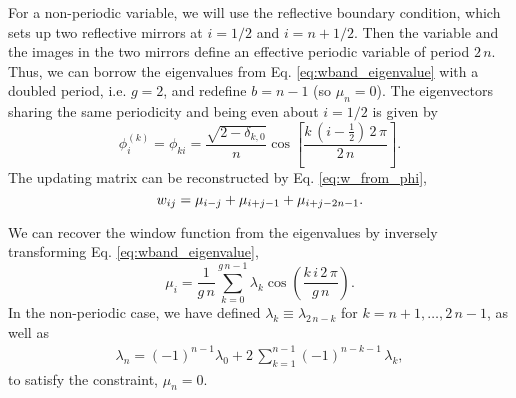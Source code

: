 \documentclass[reprint, superscriptaddress, floatfix]{revtex4-1}
\begin{document}
For a non-periodic variable,
we will use the reflective boundary condition\cite{bussi2006},
which sets up two reflective mirrors at
$i = 1/2$ and $i = n + 1/2$.
%
Then the variable and the images in the two mirrors
define an effective periodic variable of period $2 \, n$.
%
Thus, we can borrow the eigenvalues from
Eq. \eqref{eq:wband_eigenvalue}
with a doubled period, i.e. $g = 2$,
and redefine $b = n - 1$
(so $\mu_n = 0$).
%
The eigenvectors sharing the same periodicity
and being even about $i = 1/2$ is given by
%
\begin{equation}
  \phi^{(k)}_i
  =
  \phi_{k i}
  =
  \frac{ \sqrt{ 2 - \delta_{k, 0} } }
       {             n              }
  \cos \left[
       \frac{ k \, \left( i - \frac 1 2 \right) \, 2 \, \pi}
            {             2 \, n                           }
       \right]
  .
  \label{eq:wband_eigenvector_refl}
\end{equation}
%
The updating matrix can be reconstructed
by Eq. \eqref{eq:w_from_phi},
%
%
\begin{equation}
  w_{ij}
  =
  \mu_{ i - j }
  +
  \mu_{ i + j - 1 }
  +
  \mu_{ i + j - 2 n - 1 }
  .
  \notag
\end{equation}
%



We can recover the window function from the eigenvalues
by inversely transforming Eq. \eqref{eq:wband_eigenvalue},
%
\begin{equation}
  \mu_i
  =
  \frac { 1 } { g \, n }
  \sum_{ k = 0 }^{ g \, n - 1 }
  \lambda_k
  \cos \left(
       \frac{ k \, i \, 2 \, \pi }
            {      g \, n        }
  \right)
  .
\label{eq:mu_from_lambda}
\end{equation}
%
In the non-periodic case,
we have defined
$\lambda_k \equiv \lambda_{2 \, n - k}$
for $k = n + 1, \dots, 2 \, n - 1$,
as well as
%
\begin{align}
  \lambda_n
  =
  (-1)^{ n - 1 }
  \lambda_0
  +
  2 \, \sum_{ k = 1 }^{ n - 1 }
      (-1)^{n - k - 1} \, \lambda_k
  ,
\label{eq:lambdan}
\end{align}
to satisfy the constraint, $\mu_n = 0$.
%
\end{document}
